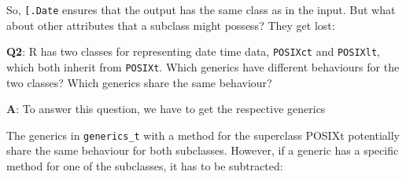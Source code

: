 \documentclass[
]{krantz}
\makeatletter
\newenvironment{Shaded}{\begin{snugshade}}{\end{snugshade}}
\newcommand{\CommentTok}[1]{\textcolor[rgb]{0.56,0.35,0.01}{\textit{#1}}}
\newcommand{\DataTypeTok}[1]{\textcolor[rgb]{0.13,0.29,0.53}{#1}}
\newcommand{\DecValTok}[1]{\textcolor[rgb]{0.00,0.00,0.81}{#1}}
\newcommand{\KeywordTok}[1]{\textcolor[rgb]{0.13,0.29,0.53}{\textbf{#1}}}
\newcommand{\NormalTok}[1]{#1}
\newcommand{\OperatorTok}[1]{\textcolor[rgb]{0.81,0.36,0.00}{\textbf{#1}}}
\newcommand{\StringTok}[1]{\textcolor[rgb]{0.31,0.60,0.02}{#1}}
\newenvironment{kframe}{%
\medskip{}
\setlength{\fboxsep}{.8em}
 \def\at@end@of@kframe{}%
 \ifinner\ifhmode%
  \def\at@end@of@kframe{\end{minipage}}%
  \begin{minipage}{\columnwidth}%
 \fi\fi%
 \def\FrameCommand##1{\hskip\@totalleftmargin \hskip-\fboxsep
 \colorbox{shadecolor}{##1}\hskip-\fboxsep
     \hskip-\linewidth \hskip-\@totalleftmargin \hskip\columnwidth}%
 \MakeFramed {\advance\hsize-\width
   \@totalleftmargin\z@ \linewidth\hsize
   \@setminipage}}%
 {\par\unskip\endMakeFramed%
 \at@end@of@kframe}
\renewenvironment{Shaded}{\begin{kframe}}{\end{kframe}}
\renewcommand{\KeywordTok} [1]{\textcolor[rgb]{0.00,0.44,0.13}{{#1}}}
\renewcommand{\DataTypeTok}[1]{\textcolor[rgb]{0.56,0.13,0.00}{{#1}}}
\renewcommand{\DecValTok}  [1]{\textcolor[rgb]{0.25,0.63,0.44}{{#1}}}
\renewcommand{\StringTok}  [1]{\textcolor[rgb]{0.25,0.44,0.63}{{#1}}}
\renewcommand{\CommentTok} [1]{\textcolor[rgb]{0.38,0.63,0.69}{{#1}}}
\renewcommand{\NormalTok}  [1]{{#1}}
\makeatother
\begin{document}
So, \texttt{{[}.Date} ensures that the output has the same class as in the input. But what about other attributes that a subclass might possess? They get lost:

\begin{Shaded}
\end{Shaded}

\textbf{{Q2}}: R has two classes for representing date time data, \texttt{POSIXct} and \texttt{POSIXlt}, which both inherit from \texttt{POSIXt}. Which generics have different behaviours for the two classes? Which generics share the same behaviour?

\textbf{{A}}: To answer this question, we have to get the respective generics

\begin{Shaded}
\end{Shaded}

The generics in \texttt{generics\_t} with a method for the superclass POSIXt potentially share the same behaviour for both subclasses. However, if a generic has a specific method for one of the subclasses, it has to be subtracted:
\end{document}
